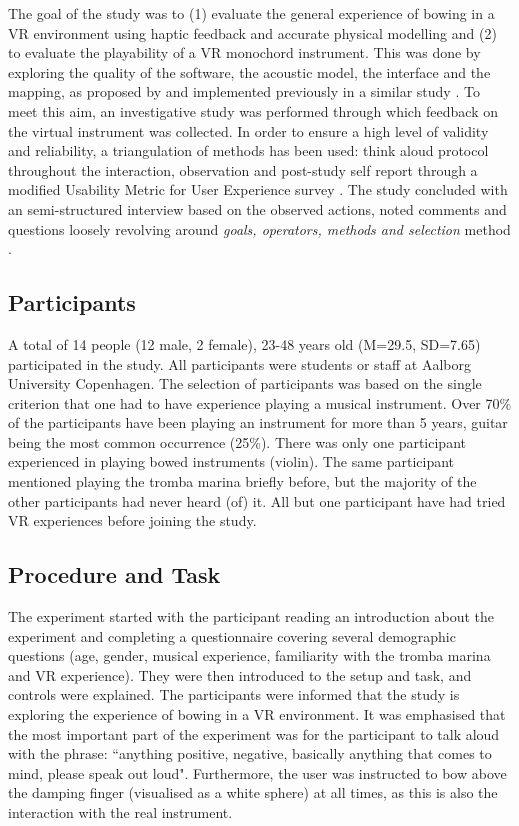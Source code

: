 \documentclass[dvipsnames, pdftex]{article}
\begin{document}
The goal of the study was to (1) evaluate the  general experience of bowing in a VR environment using haptic feedback and accurate physical modelling and (2) to evaluate the  playability of a VR monochord instrument. This was done by exploring the quality of the software, the acoustic model, the interface and the mapping, as proposed by \cite{Barbosa2015} and implemented previously in a similar study \cite{Young2003}. To meet this aim, an investigative study was performed through which feedback on the virtual instrument was collected. In order to ensure a high level of validity and reliability, a triangulation of methods has been used: think aloud protocol \cite{Someren1994} throughout the interaction, observation and post-study self report through a modified Usability Metric for User Experience survey \cite{Finstad2010}. The study concluded with an semi-structured interview based on the observed actions, noted comments and questions loosely revolving around \textit{goals, operators, methods and selection} method \cite{Card1983}.

\subsection{Participants}

A total of 14 people (12 male, 2 female), 23-48 years old (M=29.5, SD=7.65)  participated in the study. All participants were students or staff at Aalborg University Copenhagen. The selection of participants was based on the single criterion that one had to have experience playing a musical instrument. Over 70\% of the participants have been playing an instrument for more than 5 years, guitar being the most common occurrence (25\%). There was only one participant experienced in playing bowed instruments (violin). The same participant mentioned playing the tromba marina briefly before, but the majority of the other participants had never heard (of) it. All but one participant have had tried VR experiences before joining the study. 

\subsection{Procedure and Task}

The experiment started with the participant reading an introduction about the experiment and completing a questionnaire covering several demographic questions (age, gender, musical experience, familiarity with the tromba marina and VR experience). They were then introduced to the setup and task, and controls were explained. The participants were informed that the study is exploring the experience of bowing in a VR environment. It was emphasised that the most important part of the experiment was for the participant to talk aloud with the phrase: ``anything positive, negative, basically anything that comes to mind, please speak out loud". Furthermore, the user was instructed to bow above the damping finger (visualised as a white sphere) at all times, as this is also the interaction with the real instrument. 
\end{document}
